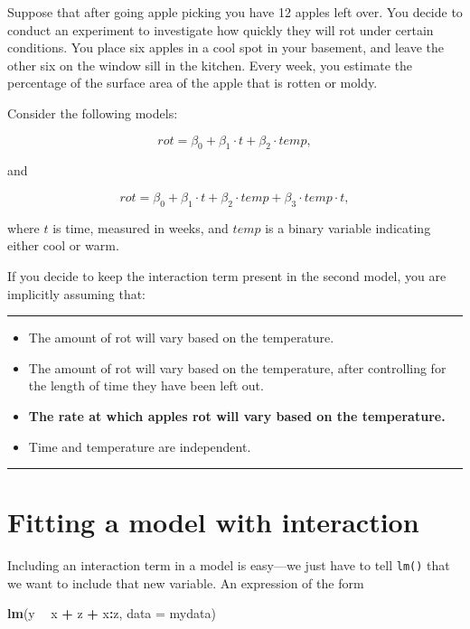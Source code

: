 \documentclass[
]{book}
\newenvironment{Shaded}{\begin{snugshade}}{\end{snugshade}}
\newcommand{\DataTypeTok}[1]{\textcolor[rgb]{0.13,0.29,0.53}{#1}}
\newcommand{\KeywordTok}[1]{\textcolor[rgb]{0.13,0.29,0.53}{\textbf{#1}}}
\newcommand{\NormalTok}[1]{#1}
\newcommand{\OperatorTok}[1]{\textcolor[rgb]{0.81,0.36,0.00}{\textbf{#1}}}
\newcommand{\StringTok}[1]{\textcolor[rgb]{0.31,0.60,0.02}{#1}}
\begin{document}
Suppose that after going apple picking you have 12 apples left over. You decide to conduct an experiment to investigate how quickly they will rot under certain conditions. You place six apples in a cool spot in your basement, and leave the other six on the window sill in the kitchen. Every week, you estimate the percentage of the surface area of the apple that is rotten or moldy.

Consider the following models:

\[rot=\beta_0 + \beta_1\cdot t + \beta_2 \cdot temp,\]

and

\[rot=\beta_0 + \beta_1\cdot t + \beta_2 \cdot temp + \beta_3 \cdot temp \cdot t,\]

where \(t\) is time, measured in weeks, and \(temp\) is a binary variable indicating either cool or warm.

If you decide to keep the interaction term present in the second model, you are implicitly assuming that:

\begin{center}\rule{0.5\linewidth}{0.5pt}\end{center}

\begin{itemize}
\item
  The amount of rot will vary based on the temperature.
\item
  The amount of rot will vary based on the temperature, after controlling for the length of time they have been left out.
\item
  \textbf{The rate at which apples rot will vary based on the temperature.}
\item
  Time and temperature are independent.
\end{itemize}

\begin{center}\rule{0.5\linewidth}{0.5pt}\end{center}

\hypertarget{fitting-a-model-with-interaction}{%
\section{Fitting a model with interaction}\label{fitting-a-model-with-interaction}}

Including an interaction term in a model is easy---we just have to tell \texttt{lm()} that we want to include that new variable. An expression of the form

\begin{Shaded}
\begin{Highlighting}[]
\KeywordTok{lm}\NormalTok{(y }\OperatorTok{~}\StringTok{ }\NormalTok{x }\OperatorTok{+}\StringTok{ }\NormalTok{z }\OperatorTok{+}\StringTok{ }\NormalTok{x}\OperatorTok{:}\NormalTok{z, }\DataTypeTok{data =}\NormalTok{ mydata)}
\end{Highlighting}
\end{Shaded}
\end{document}
